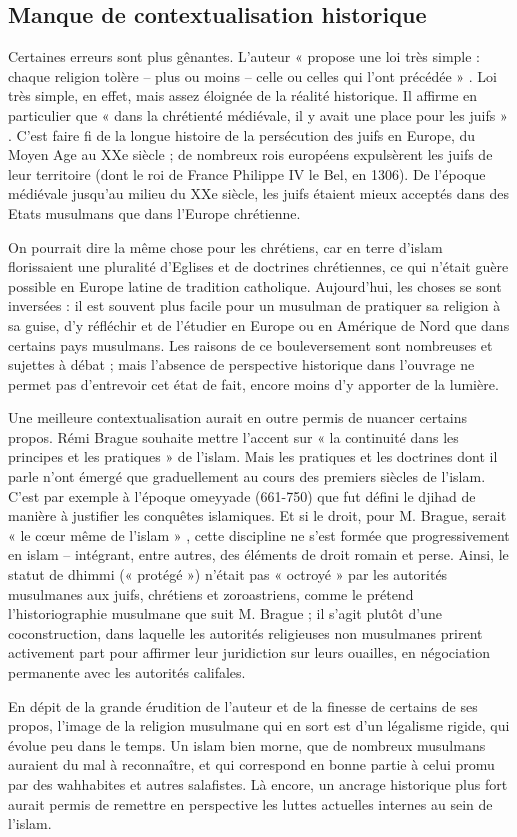  \subsection{Manque de contextualisation historique}


Certaines erreurs sont plus gênantes. L’auteur « propose une loi très simple : chaque religion tolère – plus ou moins – celle ou celles qui l’ont précédée » . Loi très simple, en effet, mais assez éloignée de la réalité historique. Il affirme en particulier que « dans la chrétienté médiévale, il y avait une place pour les juifs
» . C’est faire fi de la longue histoire de la persécution des juifs en Europe, du Moyen Age au XXe siècle ; de nombreux rois européens expulsèrent les juifs de leur territoire (dont le roi de France Philippe IV le Bel, en 1306). De l’époque médiévale jusqu’au milieu du XXe siècle, les juifs étaient mieux acceptés dans des Etats musulmans que dans l’Europe chrétienne.

On pourrait dire la même chose pour les chrétiens, car en terre d’islam florissaient une pluralité d’Eglises et de doctrines chrétiennes, ce qui n’était guère possible en Europe latine de tradition catholique. Aujourd’hui, les choses se sont inversées : il est souvent plus facile pour un musulman de pratiquer sa religion à sa guise, d’y réfléchir et de l’étudier en Europe ou en Amérique de
Nord que dans certains pays musulmans. Les raisons de ce bouleversement sont nombreuses et sujettes à débat ; mais l’absence de perspective historique dans l’ouvrage ne permet pas d’entrevoir cet état de fait, encore moins d’y apporter de la lumière.
 
Une meilleure contextualisation aurait en outre permis de nuancer certains propos. Rémi Brague souhaite mettre l’accent sur « la continuité dans les principes et les pratiques » de l’islam. Mais les pratiques et les doctrines dont il parle n’ont émergé que graduellement au cours des premiers siècles de l’islam. C’est par exemple à l’époque omeyyade (661-750) que fut défini le djihad de manière à justifier les conquêtes islamiques. Et si le droit, pour M. Brague, serait « le cœur même de l’islam » , cette discipline ne s’est formée que progressivement en islam – intégrant, entre autres, des éléments de droit romain et perse. Ainsi, le statut de dhimmi (« protégé ») n’était pas « octroyé » par les autorités musulmanes aux juifs, chrétiens et zoroastriens, comme le prétend l’historiographie musulmane que suit M. Brague ; il s’agit plutôt d’une coconstruction, dans laquelle les autorités religieuses non musulmanes prirent activement part pour affirmer leur juridiction sur leurs ouailles, en négociation permanente avec les autorités califales.

En dépit de la grande érudition de l’auteur et de la finesse de certains de ses propos, l’image de la religion musulmane qui en sort est d’un légalisme rigide, qui évolue peu dans le temps. Un islam bien morne, que de nombreux musulmans auraient du mal à reconnaître, et qui correspond en bonne partie à celui promu par des wahhabites et autres salafistes. Là encore, un ancrage historique plus fort aurait permis de
remettre en perspective les luttes actuelles internes au sein de l’islam.
 


